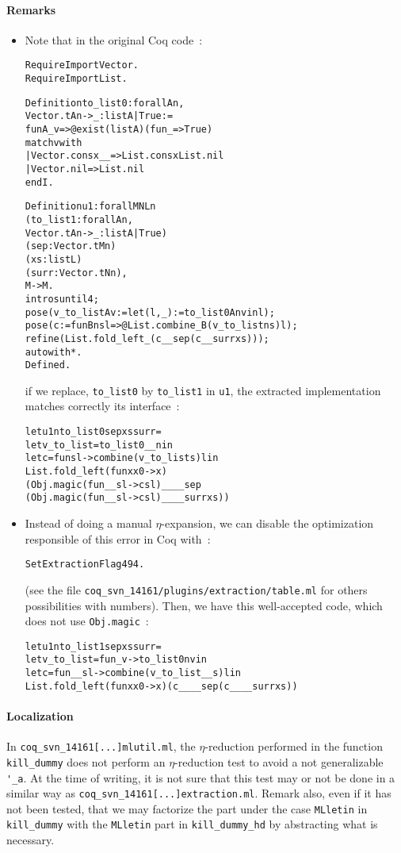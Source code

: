 \documentclass[a4paper, 11pt]{article}
\newenvironment{coq}
  {%
   \begin{alltt}
   \footnotesize} %% 8.3pl2 (April 2011)
  {\end{alltt} %
  }
\newenvironment{ml}
  {%
   \begin{alltt}
   \footnotesize} %% 3.12.0
  {\end{alltt} %
  }
\newcommand{\coqv}{14161}
\begin{document}
\paragraph{Remarks}
\begin{itemize}
\item
Note that in the original Coq code~:
\begin{coq}
Require Import Vector.
Require Import List.

Definition to_list0 : forall A n,
  Vector.t A n -> { _ : list A | True } :=
  fun A _ v => @exist (list A) (fun _ => True) 
    match v with 
    | Vector.cons x _ _ => List.cons x List.nil
    | Vector.nil => List.nil
    end I.

Definition u1 : forall M N L n
  (to_list1 : forall A n,
  Vector.t A n -> { _ : list A | True })
  (sep : Vector.t M n)
  (xs : list L)
  (surr : Vector.t N n),
  M -> M.
  intros until 4;
  pose (v_to_list A v := let (l, _) := to_list0 A n v in l);
  pose (c := fun B n s l => @List.combine _ B (v_to_list n s) l);
  refine (List.fold_left _ (c _ _ sep (c _ _ surr xs)));
  auto with *.
Defined.
\end{coq}
if we replace, \verb|to_list0| by \verb|to_list1| in \verb|u1|, the extracted implementation matches correctly its interface~:
\begin{ml}
let u1 n to_list0 sep xs surr =
  let v_to_list = to_list0 __ n in
  let c = fun s l -> combine (v_to_list s) l in
  List.fold_left (fun x x0 -> x)
    (Obj.magic (fun _ _ s l -> c s l) __ __ sep
      (Obj.magic (fun _ _ s l -> c s l) __ __ surr xs))
\end{ml}

\item
Instead of doing a manual $\eta$-expansion, we can disable the optimization responsible of this error in Coq with~:
\begin{coq}
Set Extraction Flag 494.
\end{coq}
(see the file {\tt coq\_svn\_\coqv/plugins/extraction/table.ml} for others possibilities with numbers).
Then, we have this well-accepted code, which does not use \verb|Obj.magic|~:
\begin{ml}
let u1 n to_list1 sep xs surr =
  let v_to_list = fun _ v -> to_list0 n v in
  let c = fun _ _ s l -> combine (v_to_list __ s) l in
  List.fold_left (fun x x0 -> x) (c __ __ sep (c __ __ surr xs))
\end{ml}
\end{itemize}

\paragraph{Localization}
In {\tt coq\_svn\_\coqv[...]mlutil.ml}, the $\eta$-reduction performed in the function \verb|kill_dummy| does not perform an $\eta$-reduction test to avoid a not generalizable \verb|'_a|. At the time of writing, it is not sure that this test may or not be done in a similar way as {\tt coq\_svn\_\coqv[...]extraction.ml}.
Remark also, even if it has not been tested, that we may factorize the part under the case \verb|MLletin| in \verb|kill_dummy| with the \verb|MLletin| part in \verb|kill_dummy_hd| by abstracting what is necessary.
\end{document}
